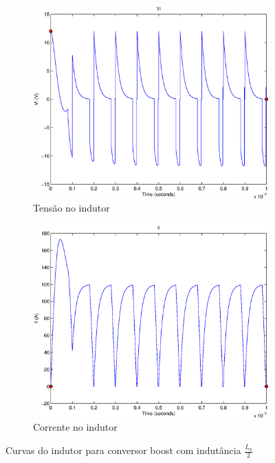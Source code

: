\documentclass{article}
\begin{document}
\begin{figure}[H]
	\centering
	\begin{subfigure}[b]{0.4\linewidth}
		\includegraphics[width=\linewidth]{matlab/boost/b_vl2}
		\caption{Tensão no indutor}
	\end{subfigure}
	\begin{subfigure}[b]{0.4\linewidth}
		\centering
		\includegraphics[width=\linewidth]{matlab/boost/b_il2}
		\caption{Corrente no indutor}
	\end{subfigure}
	\caption{Curvas do indutor para conversor boost com indutância $\frac{L_b}{2}$}
	\label{fig:bol2}
\end{figure}
\end{document}
